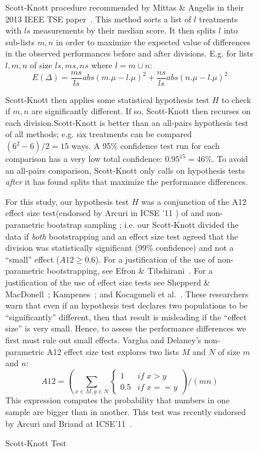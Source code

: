 \begin{figure}[!ht]
    \centering
    \begin{minipage}[c]{\linewidth}
    \begin{mdframed}
    Scott-Knott procedure recommended by Mittas \& Angelis in their 2013 IEEE TSE paper~\cite{mittas13}.  This method sorts a list of $l$ treatments with $ls$ measurements by their median score. It then splits $l$ into sub-lists $m,n$ in order to maximize the expected value of differences  in the observed performances before and after divisions. E.g. for lists $l,m,n$ of size $ls,ms,ns$ where $l=m\cup n$:
     \[E(\Delta)=\frac{ms}{ls}abs(m.\mu - l.\mu)^2 + \frac{ns}{ls}abs(n.\mu - l.\mu)^2\]

    Scott-Knott then applies some statistical hypothesis test $H$ to check if $m,n$ are significantly different. If so, Scott-Knott then recurses on each division.Scott-Knott is better than an all-pairs hypothesis test of all methods; e.g. six treatments can be compared \mbox{$(6^2-6)/2=15$} ways.  A 95\% confidence test run for each comparison has  a very low total confidence: \mbox{$0.95^{15} = 46$}\%. To avoid an all-pairs comparison, Scott-Knott only calls on hypothesis tests {\em after} it has found splits that maximize the performance differences.

    For this study, our hypothesis test $H$ was a conjunction of the A12 effect size test(endorsed by Arcuri \etal in ICSE '11 \cite{arcuri11}) of  and non-parametric bootstrap sampling \cite{efron93}; i.e. our Scott-Knott divided the data if {\em both}
    bootstrapping and an effect size test agreed that the division was statistically significant (99\% confidence) and not a ``small'' effect ($A12 \ge 0.6$). 
    For a justification of the use of non-parametric
    bootstrapping, see Efron \&
    Tibshirani~\cite[p220-223]{efron93}.
    For a justification of the use of effect size tests
    see Shepperd \& MacDonell~\cite{shepperd12a}; Kampenes~\cite{kampenes07}; and
    Kocaguneli et al.~\cite{kocharm13}. These researchers
    warn that even if an
    hypothesis test declares two populations to be
    ``significantly'' different, then that result is
    misleading if the ``effect size'' is very small.
    Hence, to assess 
    the performance differences 
    we first must rule out small effects.
    Vargha and Delaney's
    non-parametric 
    A12 effect size test 
    explores
    two lists $M$ and $N$ of size $m$ and $n$:
    \[A12 = \left(\sum_{x\in M, y \in N} 
    \begin{cases} 
    1   & \mathit{if}\; x > y\\
    0.5 & \mathit{if}\; x == y
    \end{cases}\right) / (mn)
    \]
    This expression computes the probability that numbers in one sample are bigger than in another.
    This test was recently 
    endorsed by Arcuri and Briand
    at ICSE'11~\cite{arcuri11}.
    \end{mdframed}
    \caption{Scott-Knott Test}
    \end{minipage}
    \label{fig:sk}
\end{figure}

